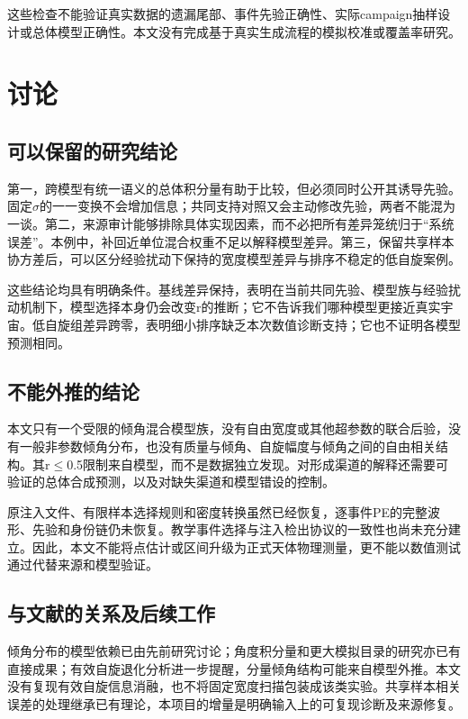\documentclass[UTF8,a4paper,11pt,fontset=fandol]{ctexart}
\begin{document}
这些检查不能验证真实数据的遗漏尾部、事件先验正确性、实际campaign抽样设计或总体模型正确性。本文没有完成基于真实生成流程的模拟校准或覆盖率研究。

\FloatBarrier
\section{讨论}\label{sec:9}
\subsection{可以保留的研究结论}\label{sec:9.1}
第一，跨模型有统一语义的总体积分量有助于比较，但必须同时公开其诱导先验。固定\(\sigma\)的一一变换不会增加信息；共同支持对照又会主动修改先验，两者不能混为一谈。第二，来源审计能够排除具体实现因素，而不必把所有差异笼统归于“系统误差”。本例中，补回近单位混合权重不足以解释模型差异。第三，保留共享样本协方差后，可以区分经验扰动下保持的宽度模型差异与排序不稳定的低自旋案例。

这些结论均具有明确条件。基线差异保持，表明在当前共同先验、模型族与经验扰动机制下，模型选择本身仍会改变r的推断；它不告诉我们哪种模型更接近真实宇宙。低自旋组差异跨零，表明细小排序缺乏本次数值诊断支持；它也不证明各模型预测相同。

\subsection{不能外推的结论}\label{sec:9.2}
本文只有一个受限的倾角混合模型族，没有自由宽度或其他超参数的联合后验，没有一般非参数倾角分布，也没有质量与倾角、自旋幅度与倾角之间的自由相关结构。其r\(\leq\)0.5限制来自模型，而不是数据独立发现。对形成渠道的解释还需要可验证的总体合成预测，以及对缺失渠道和模型错设的控制\cite{ref1}。

原注入文件、有限样本选择规则和密度转换虽然已经恢复，逐事件PE的完整波形、先验和身份链仍未恢复。教学事件选择与注入检出协议的一致性也尚未充分建立。因此，本文不能将点估计或区间升级为正式天体物理测量，更不能以数值测试通过代替来源和模型验证。

\subsection{与文献的关系及后续工作}\label{sec:9.3}
倾角分布的模型依赖已由先前研究讨论\cite{ref2}；角度积分量和更大模拟目录的研究亦已有直接成果\cite{ref5}；有效自旋退化分析进一步提醒，分量倾角结构可能来自模型外推\cite{ref6}。本文没有复现有效自旋信息消融，也不将固定宽度扫描包装成该类实验。共享样本相关误差的处理继承已有理论\cite{ref3,ref4}，本项目的增量是明确输入上的可复现诊断及来源修复。
\end{document}
